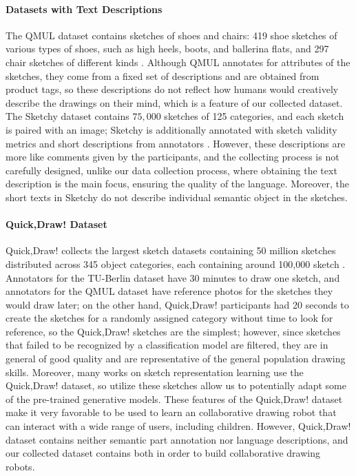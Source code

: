 \paragraph{Datasets with Text Descriptions}
The QMUL dataset contains sketches of shoes and chairs: 419 shoe sketches of various types of shoes, such as high heels, boots, and ballerina flats, and 297 chair sketches of different kinds \citep{qmulDataset}. Although QMUL annotates for attributes of the sketches, they come from a fixed set of descriptions and are obtained from product tags, so these descriptions do not reflect how humans would creatively describe the drawings on their mind, which is a feature of our collected dataset.    
The Sketchy dataset contains $75,000$ sketches of 125 categories, and each sketch is paired with an image; Sketchy is additionally annotated with sketch validity metrics and short descriptions from annotators \citep{sketchyDataset}. However, these descriptions are more like comments given by the participants, and the collecting process is not carefully designed, unlike our data collection process, where obtaining the text description is the main focus, ensuring the quality of the language. Moreover, the short texts in Sketchy do not describe individual semantic object in the sketches.     

\paragraph{Quick,Draw! Dataset}
Quick,Draw! collects the largest sketch datasets containing 50 million sketches distributed across 345 object categories, each containing around 100,000 sketch \citep{ha2017neural}. Annotators for the TU-Berlin dataset have 30 minutes to draw one sketch, and annotators for the QMUL dataset have reference photos for the sketches they would draw later; on the other hand, Quick,Draw! participants had 20 seconds to create the sketches for a randomly assigned category without time to look for reference, so the Quick,Draw! sketches are the simplest; however, since sketches that failed to be recognized by a classification model are filtered, they are in general of good quality and are representative of the general population drawing skills. Moreover, many works on sketch representation learning use the Quick,Draw! dataset, so utilize these sketches allow us to potentially adapt some of the pre-trained generative models. 
These features of the Quick,Draw! dataset make it very favorable to be used to learn an collaborative drawing robot that can interact with a wide range of users, including children. However, Quick,Draw! dataset contains neither semantic part annotation nor language descriptions, and our collected dataset contains both in order to build collaborative drawing robots.   

